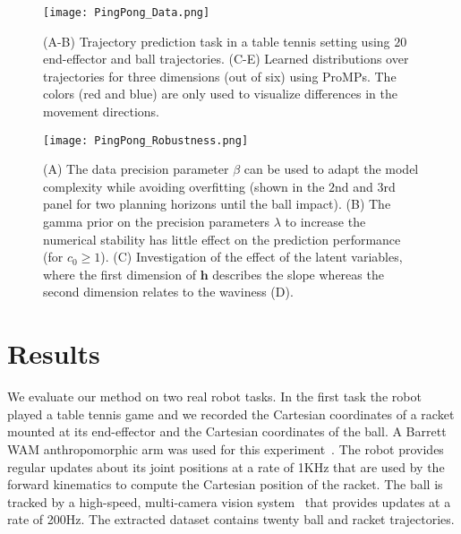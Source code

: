 
\begin{figure}[t]
\begin{center}
\texttt{[image: PingPong\_Data.png]}
\end{center}
\caption{(A-B) Trajectory prediction task in a table tennis setting using $20$ end-effector and ball trajectories. 
(C-E) Learned distributions over trajectories for three dimensions (out of six) using ProMPs. 
The colors (red and blue) are only used to visualize differences in the movement directions.
\label{fig:pingpong_data_promps}
}
\vspace{-0.5em}
\end{figure}


\begin{figure}[t]
\begin{center}
\texttt{[image: PingPong\_Robustness.png]}
\end{center}
\caption{(A) The data precision parameter $\beta$ can be used to adapt the model complexity while avoiding overfitting (shown in the $2$nd and $3$rd panel for two planning horizons until the ball impact). 
(B) The gamma prior on the precision parameters $\lambda$ to increase the numerical stability has little effect on the prediction performance (for $c_0 \ge 1$). 
(C) Investigation of the effect of the latent variables, where the first dimension of $\textbf{h}$ describes the slope whereas the second dimension relates to the waviness (D).
\label{fig:pingpong_model}}
\end{figure}

\section{Results}

We evaluate our method on two real robot tasks. In the first task the robot
played a table tennis game and we recorded the Cartesian coordinates of a
racket mounted at its end-effector and the Cartesian coordinates of the ball. 
A Barrett WAM anthropomorphic arm was used for this experiment~\cite{Muelling2011}. 
The robot provides regular updates about its
joint positions at a rate of 1KHz that are used by the forward kinematics to
compute the Cartesian position of the racket. The ball is tracked by a
high-speed, multi-camera vision system~\cite{Lampert2012} that provides updates
at a rate of 200Hz. The extracted dataset contains twenty ball and racket
trajectories. 

